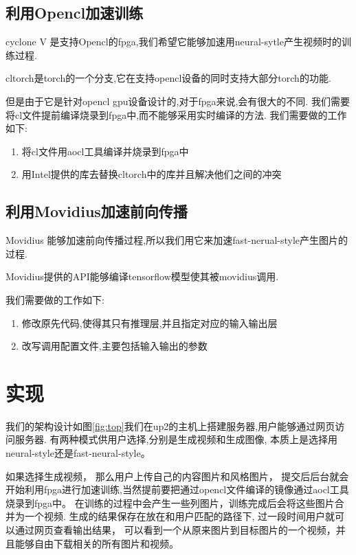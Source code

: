 \subsection{利用Opencl加速训练}
cyclone V 是支持Opencl的fpga,我们希望它能够加速用neural-sytle产生视频时的训练过程.

cltorch是torch的一个分支,它在支持opencl设备的同时支持大部分torch的功能.

但是由于它是针对opencl gpu设备设计的,对于fpga来说,会有很大的不同.
我们需要将cl文件提前编译烧录到fpga中,而不能够采用实时编译的方法.
我们需要做的工作如下:
\begin{enumerate}
  \item 将cl文件用aocl工具编译并烧录到fpga中
  \item 用Intel提供的库去替换cltorch中的库并且解决他们之间的冲突
\end{enumerate}

\subsection{利用Movidius加速前向传播}
Movidius 能够加速前向传播过程,所以我们用它来加速fast-nerual-style产生图片的过程.

Movidius提供的API能够编译tensorflow模型使其被movidius调用.

我们需要做的工作如下:
\begin{enumerate}
  \item 修改原先代码,使得其只有推理层,并且指定对应的输入输出层
  \item 改写调用配置文件,主要包括输入输出的参数
\end{enumerate}

\section{实现}

我们的架构设计如图\ref{fig:top}我们在up2的主机上搭建服务器,用户能够通过网页访问服务器.
有两种模式供用户选择,分别是生成视频和生成图像, 本质上是选择用neural-style还是fast-neural-style。

如果选择生成视频， 那么用户上传自己的内容图片和风格图片，
提交后后台就会开始利用fpga进行加速训练,当然提前要把通过opencl文件编译的镜像通过aocl工具烧录到fpga中。
在训练的过程中会产生一些列图片，训练完成后会将这些图片合并为一个视频.
生成的结果保存在放在和用户匹配的路径下, 过一段时间用户就可以通过网页查看输出结果，
可以看到一个从原来图片到目标图片的一个视频，并且能够自由下载相关的所有图片和视频。

